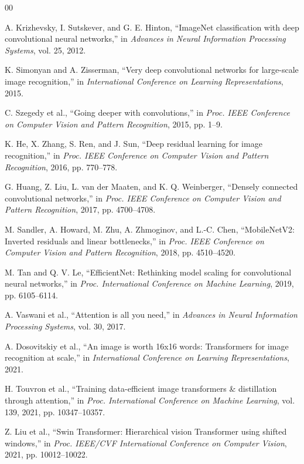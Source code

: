 \documentclass[conference]{IEEEtran}
\begin{document}
\begin{thebibliography}{00}

A. Krizhevsky, I. Sutskever, and G. E. Hinton, ``ImageNet classification with deep convolutional neural networks,'' in \textit{Advances in Neural Information Processing Systems}, vol. 25, 2012.

K. Simonyan and A. Zisserman, ``Very deep convolutional networks for large-scale image recognition,'' in \textit{International Conference on Learning Representations}, 2015.

C. Szegedy et al., ``Going deeper with convolutions,'' in \textit{Proc. IEEE Conference on Computer Vision and Pattern Recognition}, 2015, pp. 1--9.

K. He, X. Zhang, S. Ren, and J. Sun, ``Deep residual learning for image recognition,'' in \textit{Proc. IEEE Conference on Computer Vision and Pattern Recognition}, 2016, pp. 770--778.

G. Huang, Z. Liu, L. van der Maaten, and K. Q. Weinberger, ``Densely connected convolutional networks,'' in \textit{Proc. IEEE Conference on Computer Vision and Pattern Recognition}, 2017, pp. 4700--4708.

M. Sandler, A. Howard, M. Zhu, A. Zhmoginov, and L.-C. Chen, ``MobileNetV2: Inverted residuals and linear bottlenecks,'' in \textit{Proc. IEEE Conference on Computer Vision and Pattern Recognition}, 2018, pp. 4510--4520.

M. Tan and Q. V. Le, ``EfficientNet: Rethinking model scaling for convolutional neural networks,'' in \textit{Proc. International Conference on Machine Learning}, 2019, pp. 6105--6114.

A. Vaswani et al., ``Attention is all you need,'' in \textit{Advances in Neural Information Processing Systems}, vol. 30, 2017.

A. Dosovitskiy et al., ``An image is worth 16x16 words: Transformers for image recognition at scale,'' in \textit{International Conference on Learning Representations}, 2021.

H. Touvron et al., ``Training data-efficient image transformers \& distillation through attention,'' in \textit{Proc. International Conference on Machine Learning}, vol. 139, 2021, pp. 10347--10357.

Z. Liu et al., ``Swin Transformer: Hierarchical vision Transformer using shifted windows,'' in \textit{Proc. IEEE/CVF International Conference on Computer Vision}, 2021, pp. 10012--10022.


\end{thebibliography}
\end{document}
